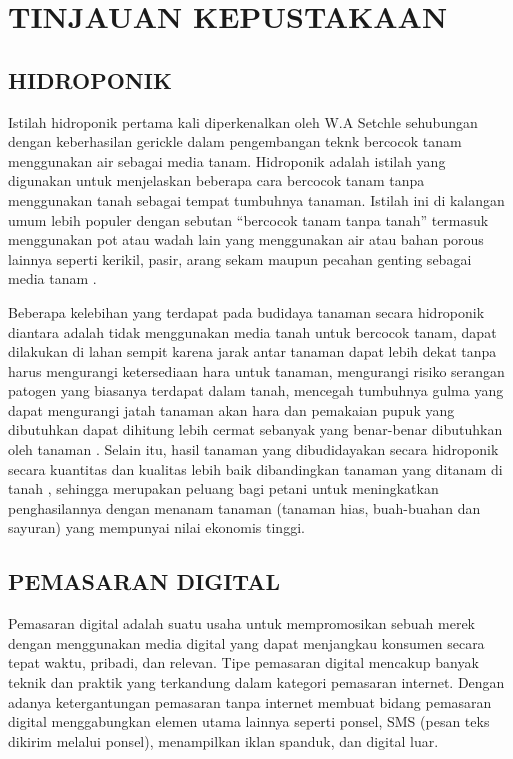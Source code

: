\fancyhf{} 
\fancyfoot[C]{\thepage}
\chapter{TINJAUAN KEPUSTAKAAN}               

\section{\uppercase{Hidroponik}}
Istilah hidroponik pertama kali diperkenalkan oleh W.A Setchle sehubungan dengan keberhasilan gerickle dalam pengembangan teknk bercocok tanam menggunakan air sebagai media tanam. Hidroponik adalah istilah yang digunakan untuk menjelaskan beberapa cara bercocok tanam tanpa menggunakan tanah sebagai tempat tumbuhnya tanaman. Istilah ini di kalangan umum lebih populer dengan sebutan “bercocok tanam tanpa tanah” termasuk menggunakan pot atau wadah lain yang menggunakan air atau bahan porous lainnya seperti kerikil, pasir, arang sekam maupun pecahan genting sebagai media tanam \citep{lingga1992}.

\par Beberapa kelebihan yang terdapat pada budidaya tanaman secara hidroponik diantara adalah tidak menggunakan media tanah untuk bercocok tanam, dapat dilakukan di lahan sempit karena jarak antar tanaman dapat lebih dekat tanpa harus mengurangi ketersediaan hara untuk tanaman, mengurangi risiko serangan patogen yang biasanya terdapat dalam tanah, mencegah tumbuhnya gulma yang dapat mengurangi jatah tanaman akan hara dan pemakaian pupuk yang dibutuhkan dapat dihitung lebih cermat sebanyak yang benar-benar dibutuhkan oleh tanaman \citep{soeseno1991, anonim1992}. Selain itu, hasil tanaman yang dibudidayakan secara hidroponik secara kuantitas dan kualitas lebih baik dibandingkan tanaman yang ditanam di tanah \citep{resh1995hydroponic}, sehingga merupakan peluang bagi petani untuk meningkatkan penghasilannya dengan menanam tanaman (tanaman hias, buah-buahan dan sayuran) yang mempunyai nilai ekonomis tinggi.

\section{\uppercase{Pemasaran Digital}}
Pemasaran digital adalah suatu usaha untuk mempromosikan sebuah merek dengan menggunakan media digital yang dapat menjangkau konsumen secara tepat waktu, pribadi, dan relevan. Tipe pemasaran digital mencakup banyak teknik dan praktik yang terkandung dalam kategori pemasaran internet. Dengan adanya ketergantungan pemasaran tanpa internet membuat bidang pemasaran digital menggabungkan elemen utama lainnya seperti ponsel, SMS (pesan teks dikirim melalui ponsel), menampilkan iklan spanduk, dan digital luar. \citep{wikipedia2021}

